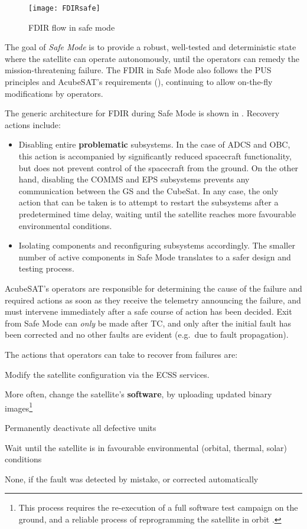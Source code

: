 \documentclass[a4paper,nobib,final]{tufte-book}
\begin{document}
\begin{figure}[h]
	\texttt{[image: FDIRsafe]}
	\caption{\acs{FDIR} flow in safe mode}
	\label{fig:safeflow}
\end{figure}


The goal of \emph{Safe Mode} is to provide a robust, well-tested and deterministic state where the satellite can operate autonomously, until the operators can remedy the mission-threatening failure. The \acs{FDIR} in Safe Mode also follows the \acs{PUS} principles and AcubeSAT's requirements (), continuing to allow on-the-fly modifications by operators.

The generic architecture for \acs{FDIR} during Safe Mode is shown in . Recovery actions include:
\begin{itemize}
	\item Disabling entire \textbf{problematic} subsystems. In the case of \acs{ADCS} and \acs{OBC}, this action is accompanied by significantly reduced spacecraft functionality, but does not prevent control of the spacecraft from the ground. On the other hand, disabling the \acs{COMMS} and \acs{EPS} subsystems prevents any communication between the \acl{GS} and the CubeSat. In any case, the only action that can be taken is to attempt to restart the subsystems after a predetermined time delay, waiting until the satellite reaches more favourable environmental conditions.
	\item Isolating components and reconfiguring subsystems accordingly. The smaller number of active components in Safe Mode translates to a safer design and testing process.
\end{itemize}

AcubeSAT's operators are responsible for determining the cause of the failure and required actions as soon as they receive the telemetry announcing the failure, and must intervene immediately after a safe course of action has been decided. Exit from Safe Mode can \emph{only} be made after \acs{TC}, and only after the initial fault has been corrected and no other faults are evident (e.g.\ due to fault propagation).

The actions that operators can take to recover from failures are:
\begin{compactitem}
	\item Modify the satellite configuration via the \acs{ECSS} services.
	\item More often, change the satellite's \textbf{software}, by uploading updated binary images\footnote{This process requires the re-execution of a full software test campaign on the ground, and a reliable process of reprogramming the satellite in orbit \autocite[45]{DDJF_OBSW}.}
	\item Permanently deactivate all defective units
	\item Wait until the satellite is in favourable environmental (orbital, thermal, solar) conditions
	\item None, if the fault was detected by mistake, or corrected automatically
\end{compactitem}
\end{document}
